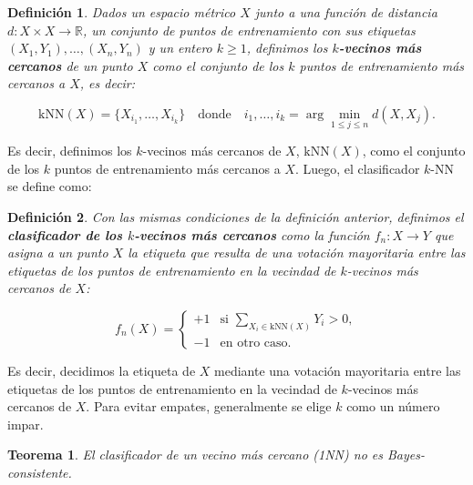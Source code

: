 \documentclass{report}
\newtheorem{thm}{Teorema}[subsection]
\newtheorem{dfn}{Definición}[subsection]
\begin{document}
\begin{dfn}
    Dados un espacio métrico \(X\) junto a una función de distancia \(d : X \times X \to \mathbb{R}\), 
    un conjunto de puntos de entrenamiento con sus etiquetas \((X_1, Y_1), \dots, (X_n, Y_n)\) y un entero \(k \geq 1\), 
    definimos los \textbf{\(k\)-vecinos más cercanos} de un punto \(X\) como el conjunto de los \(k\) puntos 
    de entrenamiento más cercanos a \(X\), es decir:

    \[
    \text{kNN}(X) = \{X_{i_1}, \dots, X_{i_k}\} \quad \text{donde} \quad i_1, \dots, i_k = \arg\min_{1 \leq j \leq n} d(X, X_j).
    \]
\end{dfn}

Es decir, definimos los 
\(k\)-vecinos más cercanos de \(X\), \(\text{kNN}(X)\), como el conjunto de los \(k\) puntos de 
entrenamiento más cercanos a \(X\). Luego, el clasificador \(k\)-NN se define como:

\begin{dfn}
    Con las mismas condiciones de la definición anterior,
    definimos el \textbf{clasificador de los \(k\)-vecinos más cercanos} como la función \(f_n : X \to Y\) 
    que asigna a un punto \(X\) la etiqueta que resulta de una votación mayoritaria entre las etiquetas 
    de los puntos de entrenamiento en la vecindad de \(k\)-vecinos más cercanos de \(X\):


    \[
f_n(X) = 
\begin{cases} 
+1 & \text{si } \underset{{X_i \in \text{kNN}(X)}}{\sum}Y_i > 0, \\ 
-1 & \text{en otro caso}.
\end{cases}
\]
\end{dfn}


Es decir, decidimos la etiqueta de \(X\) mediante una votación mayoritaria entre las etiquetas de los 
puntos de entrenamiento en la vecindad de \(k\)-vecinos más cercanos de \(X\). Para evitar empates, 
generalmente se elige \(k\) como un número impar.\newline


\begin{thm}
    El clasificador de un vecino más cercano (1NN) no es Bayes-consistente.
\end{thm}
\end{document}
